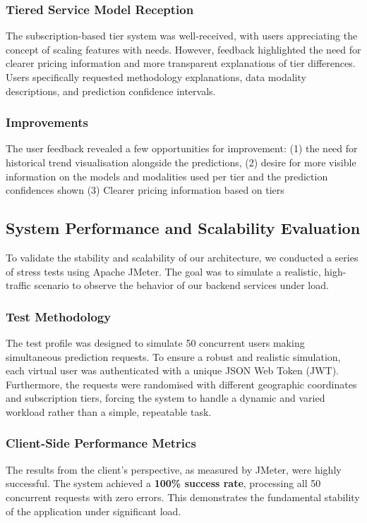 \documentclass[conference]{IEEEtran}
\begin{document}
\subsubsection{Tiered Service Model Reception}
The subscription-based tier system was well-received, with users appreciating the concept of scaling features with needs. However, feedback highlighted the need for clearer pricing information and more transparent explanations of tier differences. Users specifically requested methodology explanations, data modality descriptions, and prediction confidence intervals.

\subsubsection{Improvements}
The user feedback revealed a few opportunities for improvement: (1) the need for historical trend visualisation alongside the predictions, (2) desire for more visible information on the models and modalities used per tier and the prediction confidences shown (3) Clearer pricing information based on tiers

\subsection{System Performance and Scalability Evaluation}

To validate the stability and scalability of our architecture, we conducted a series of stress tests using Apache JMeter. The goal was to simulate a realistic, high-traffic scenario to observe the behavior of our backend services under load.

\subsubsection{Test Methodology}
The test profile was designed to simulate 50 concurrent users making simultaneous prediction requests. To ensure a robust and realistic simulation, each virtual user was authenticated with a unique JSON Web Token (JWT). Furthermore, the requests were randomised with different geographic coordinates and subscription tiers, forcing the system to handle a dynamic and varied workload rather than a simple, repeatable task.

\subsubsection{Client-Side Performance Metrics}
The results from the client's perspective, as measured by JMeter, were highly successful. The system achieved a \textbf{100\% success rate}, processing all 50 concurrent requests with zero errors. This demonstrates the fundamental stability of the application under significant load.
\end{document}
